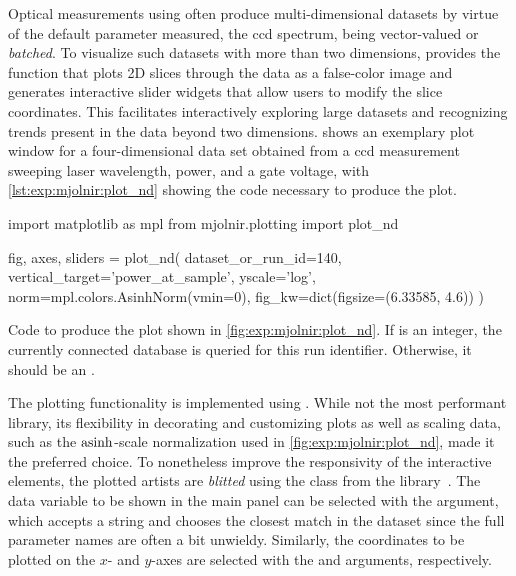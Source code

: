 Optical measurements using \mjolnir often produce multi-dimensional datasets by virtue of the default parameter measured, the \gls{ccd} spectrum, being vector-valued or \emph{batched}.
To visualize such datasets with more than two dimensions, \mjolnir provides the  function that plots 2D slices through the data as a false-color image and generates interactive slider widgets that allow users to modify the slice coordinates.
This facilitates interactively exploring large datasets and recognizing trends present in the data beyond two dimensions.
 shows an exemplary plot window for a four-dimensional data set obtained from a \gls{ccd} measurement sweeping laser wavelength, power, and a gate voltage, with \cref{lst:exp:mjolnir:plot_nd} showing the code necessary to produce the plot.

\begin{listing}
    \begin{py}
        import matplotlib as mpl
        from mjolnir.plotting import plot_nd

        fig, axes, sliders = plot_nd(
            dataset_or_run_id=140, vertical_target='power_at_sample',
            yscale='log', norm=mpl.colors.AsinhNorm(vmin=0),
            fig_kw=dict(figsize=(6.33585, 4.6))
        )
    \end{py}
    \caption[\texttt{plot_nd()} example]{
        Code to produce the plot shown in \cref{fig:exp:mjolnir:plot_nd}.
        If  is an integer, the currently connected \qcodes database is queried for this run identifier.
        Otherwise, it should be an \xarray {}.
    }
    \label{lst:exp:mjolnir:plot_nd}
\end{listing}

The plotting functionality is implemented using \matplotlib.
While not the most performant library, its flexibility in decorating and customizing plots as well as scaling data, such as the $\operatorname{asinh}$-scale normalization used in \cref{fig:exp:mjolnir:plot_nd}, made it the preferred choice.
To nonetheless improve the responsivity of the interactive elements, the plotted artists are \emph{blitted}
using the  class from the \qutil library~\cite{Hangleiter_qutil}.
The data variable to be shown in the main panel can be selected with the  argument, which accepts a string and chooses the closest match in the dataset since the full parameter names are often a bit unwieldy.
Similarly, the coordinates to be plotted on the $x$- and $y$-axes are selected with the  and  arguments, respectively.

